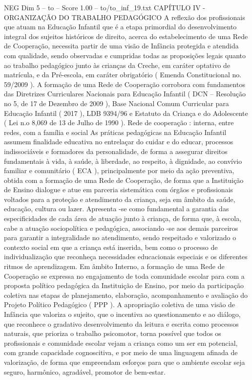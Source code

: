 \begin{textsample}{NEG Dim 5 – to – Score 1.00 – to/to\_inf\_19.txt}  \label{ex:f5_neg_270}
CAPÍTULO IV - ORGANIZAÇÃO DO TRABALHO PEDAGÓGICO A reflexão dos profissionais que atuam na Educação Infantil que é a etapa primordial do desenvolvimento integral dos sujeitos históricos de direito, acerca do estabelecimento de uma Rede de Cooperação, necessita partir de uma visão de Infância protegida e atendida com qualidade, sendo observadas e cumpridas todas as proposições legais quanto ao trabalho pedagógico junto às crianças da Creche, em caráter optativo de matrícula, e da Pré-escola, em caráter obrigatório ( Emenda Constitucional no. 59/2009 ).
A formação de uma Rede de Cooperação corrobora com fundamentos das Diretrizes Curriculares Nacionais para Educação Infantil ( DCN – Resolução no 5, de 17 de Dezembro de 2009 ), Base Nacional Comum Curricular para Educação Infantil ( 2017 ), LDB 9394/96 e Estatuto da Criança e do Adolescente ( Lei n.o 8,069 de 13 de Julho de 1990 ).
Rede de cooperação : interna, entre redes, com a família e social As práticas pedagógicas na Educação Infantil assumem finalidade educativa no entrelaçar do cuidar e do educar, processos indissociáveis e formadores da personalidade, de forma a assegurar direitos fundamentais à vida, à saúde, à liberdade, ao respeito, à dignidade, ao convívio familiar e comunitário ( ECA ), principalmente por meio da ação preventiva, obtida com a formação de uma Rede de Cooperação, de forma que a Instituição de Ensino dialogue e atue em parceria sistemática com órgãos e profissionais voltados para a proteção e atendimento da criança, seja em âmbito da saúde, educação, cultura ou lazer.
Apresenta -se como fundamental a garantia das especificidades de cada área de atuação junto à criança, de forma que, à escola, cabe a atuação sociopolítica e pedagógica, associando -se aos demais parceiros para garantir a integralidade no atendimento, sendo respeitado e valorizado o contexto social em que a criança está inserida, bem como o processo de individualização que reconheça necessidades educacionais especiais e os diferentes ritmos de aprendizagem.
Em âmbito Interno, a formação de uma Rede de Cooperação se expressa no engajamento de toda comunidade escolar para com a proposta político pedagógica da Instituição de Ensino, por meio da participação coletiva nas etapas de planejamento, elaboração, acompanhamento e avaliação do Projeto Político Pedagógico ( PPP ).
A apropriação coletiva de uma visão de Infância que valoriza o sujeito, que o incentiva ao questionamento e ao diálogo, que reconhece o gradativo desenvolvimento da leitura e escrita como processos naturais, que prioriza o trabalho psicomotor, torna possível que todos os profissionais e comunidade escolar vejam a criança como um ser em potencial, com grande capacidade cognoscitiva, e por meio de uma linguagem afinada de valorização, de forma que empreendam esforços para que o ambiente escolar seja seguro, harmônico, agradável, promotor de bem-estar.

\end{textsample}
